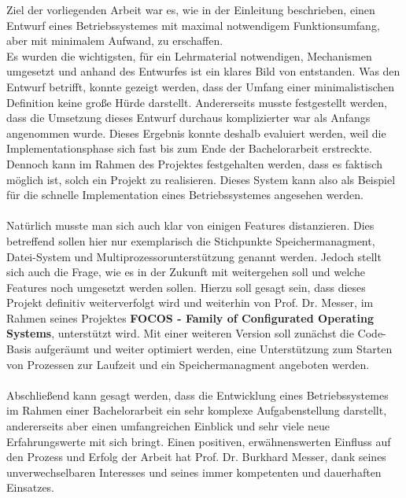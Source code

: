 Ziel der vorliegenden Arbeit war es, wie in der Einleitung beschrieben, einen Entwurf eines Betriebssystemes mit maximal notwendigem Funktionsumfang, aber mit minimalem Aufwand, zu erschaffen.\\
Es wurden die wichtigsten, f\"ur ein Lehrmaterial notwendigen, Mechanismen umgesetzt und anhand des Entwurfes ist ein klares Bild von \mops entstanden. Was den Entwurf betrifft, konnte gezeigt werden, dass der Umfang einer minimalistischen Definition keine gro\ss e H\"urde darstellt. Andererseits musste festgestellt werden, dass die Umsetzung dieses Entwurf durchaus komplizierter war als Anfangs angenommen wurde. Dieses Ergebnis konnte deshalb evaluiert werden, weil die Implementationsphase sich fast bis zum Ende der Bachelorarbeit erstreckte. Dennoch kann im Rahmen des Projektes festgehalten werden, dass es faktisch m\"oglich ist, solch ein Projekt zu realisieren. Dieses System kann also als Beispiel f\"ur die schnelle Implementation eines Betriebssystemes angesehen werden.\\\\
Nat\"urlich musste man sich auch klar von einigen Features distanzieren. Dies betreffend sollen hier nur exemplarisch die Stichpunkte Speichermanagment, Datei-System und Multiprozessorunterst\"utzung genannt werden. Jedoch stellt sich auch die Frage, wie es in der Zukunft mit \mops weitergehen soll und welche Features noch umgesetzt werden sollen. Hierzu soll gesagt sein, dass dieses Projekt definitiv weiterverfolgt wird und weiterhin von Prof. Dr. Messer, im Rahmen seines Projektes \textbf{FOCOS - Family of Configurated Operating Systems}, unterst\"utzt wird. Mit einer weiteren Version soll zun\"achst die Code-Basis aufger\"aumt und weiter optimiert werden, eine Unterst\"utzung zum Starten von Prozessen zur Laufzeit und ein Speichermanagment angeboten werden.\\\\
Abschlie\ss end kann gesagt werden, dass die Entwicklung eines Betriebssystemes im Rahmen einer Bachelorarbeit ein sehr komplexe Aufgabenstellung darstellt, andererseits aber einen umfangreichen Einblick und sehr viele neue Erfahrungswerte mit sich bringt. Einen positiven, erw\"ahnenswerten Einfluss  auf den Prozess und Erfolg der Arbeit hat Prof. Dr. Burkhard Messer, dank seines unverwechselbaren Interesses und seines immer kompetenten und dauerhaften Einsatzes.